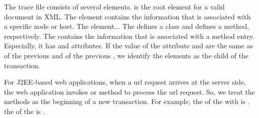 The trace file consists of several elements. 
 is the root element for a valid document in XML. The  element contains the information that is associated with a specific node or host. The  element...
The  defines a class and  defines a method, respectively.
The  contains the information that is associated with a method entry. Especially, it has  and  attributes. If the value of the attribute  and  are the same as  of the previous  and  of the previous , we identify the  elements as the child of the transaction. 

For J2EE-based web applications, when a url request arrives at the server side, the web application invokes  or  method to process the url request.
So, we treat the methods as the beginning of a new transaction.
For example, the  of the  with  is .
the  of the  is . 